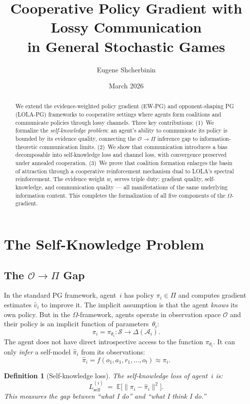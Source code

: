\documentclass[11pt]{article}
\title{Cooperative Policy Gradient with Lossy Communication\\
in General Stochastic Games}
\author{Eugene Shcherbinin}
\date{March 2026}
\newtheorem{definition}[theorem]{Definition}
\begin{document}
\maketitle

\begin{abstract}
We extend the evidence-weighted policy gradient (EW-PG) and opponent-shaping
PG (LOLA-PG) frameworks to cooperative settings where agents form coalitions
and communicate policies through lossy channels. Three key contributions:
(1)~We formalize the \emph{self-knowledge problem}: an agent's ability to
communicate its policy is bounded by its evidence quality, connecting the
$\mathcal{O} \to \Pi$ inference gap to information-theoretic communication
limits. (2)~We show that communication introduces a bias decomposable into
self-knowledge loss and channel loss, with convergence preserved under
annealed cooperation. (3)~We prove that coalition formation enlarges the
basin of attraction through a cooperative reinforcement mechanism dual to
LOLA's spectral reinforcement. The evidence weight $w_i$ serves triple
duty: gradient quality, self-knowledge, and communication quality --- all
manifestations of the same underlying information content. This completes
the formalization of all five components of the $\Omega$-gradient.
\end{abstract}


\section{The Self-Knowledge Problem}

\subsection{The $\mathcal{O} \to \Pi$ Gap}

In the standard PG framework, agent~$i$ has policy $\pi_i \in \Pi$ and
computes gradient estimates $\hat{v}_i$ to improve it. The implicit
assumption is that the agent \emph{knows} its own policy. But in the
$\Omega$-framework, agents operate in observation space $\mathcal{O}$
and their policy is an implicit function of parameters~$\theta_i$:
\[
  \pi_i = \pi_{\theta_i} : \mathcal{S} \to \Delta(\mathcal{A}_i).
\]
The agent does not have direct introspective access to the function
$\pi_{\theta_i}$. It can only \emph{infer} a self-model $\hat{\pi}_i$
from its observations:
\[
  \hat{\pi}_i = f(o_1, a_1, r_1, \ldots, o_t) \approx \pi_i.
\]

\begin{definition}[Self-knowledge loss]
The self-knowledge loss of agent~$i$ is:
\begin{equation}\label{eq:self-knowledge}
  L_{\text{self}}^{(i)} \;=\; \mathbb{E}\bigl[\|\pi_i - \hat{\pi}_i\|^2\bigr].
\end{equation}
This measures the gap between ``what I do'' and ``what I think I do.''
\end{definition}
\end{document}
